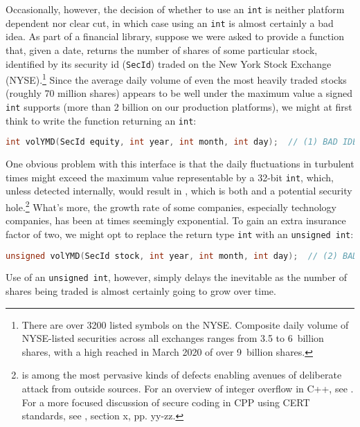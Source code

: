 Occasionally, however, the decision of whether to use an \lstinline!int! is
neither platform dependent nor clear cut, in which case using an
\lstinline!int! is almost certainly a bad idea. As part of a financial
library, suppose we were asked to provide a function that, given a date,
returns the number of shares of some particular stock, identified by its
security id (\lstinline!SecId!) traded on the New York Stock Exchange
(NYSE).\footnote{There are over 3200 listed symbols on the NYSE. Composite daily volume of NYSE-listed securities across all exchanges  ranges from 3.5 to 6~billion shares, with a high reached in March 2020 of over 9~billion shares.} Since the average daily volume of even the most heavily traded stocks (roughly 70 million shares) appears to
be well under the maximum value a signed \lstinline!int! supports (more
than 2 billion on our production platforms), we might at first think to write the function
returning an \lstinline!int!:

\begin{lstlisting}[language=C++]
int volYMD(SecId equity, int year, int month, int day);  // (1) BAD IDEA
\end{lstlisting}

\noindent One obvious problem with this interface is that the daily fluctuations
in turbulent times might exceed the maximum value representable by a
32-bit \lstinline!int!, which, unless detected internally, would result in
, which is both  and a potential security hole.{\cprotect\footnote{ is among the most pervasive kinds of defects
enabling avenues of deliberate attack from outside sources. For an overview of integer overflow in C++, see \cite{ballman}. For a more focused discussion of secure coding in CPP using CERT standards, see \cite{seacord13}, section x, pp. yy-zz.}} What's more, the growth rate of some companies,
especially technology companies, has
been at times seemingly exponential. To gain an extra
insurance factor of two, we might opt to replace the return type
\lstinline!int! with an \lstinline!unsigned!~\lstinline!int!:

\begin{lstlisting}[language=C++]
unsigned volYMD(SecId stock, int year, int month, int day);  // (2) BAD IDEA!
\end{lstlisting}

\noindent Use of an \lstinline!unsigned!~\lstinline!int!, however, simply delays the
inevitable as the number of shares being traded is almost certainly
going to grow over time.

